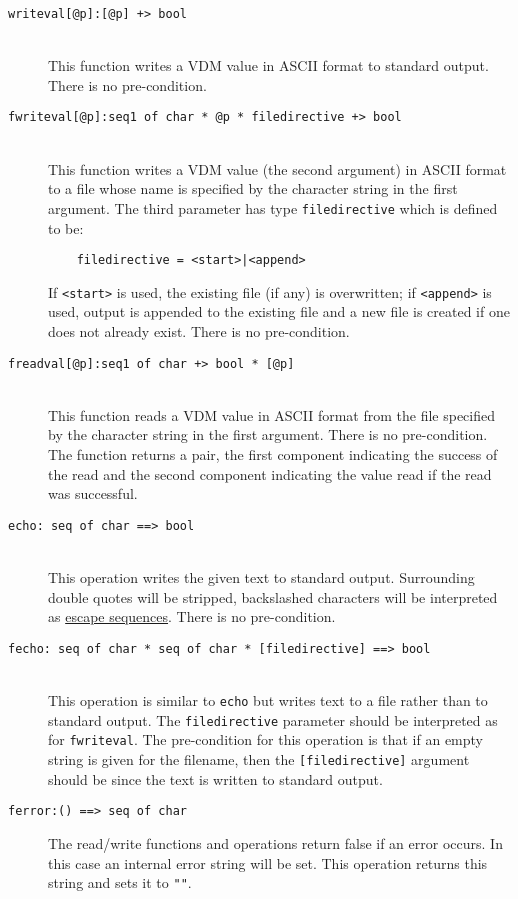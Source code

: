 \documentclass[\pformat,12pt]{article}
\begin{document}
\begin{description}
\item[\texttt{writeval[@p]:[@p] +> bool}] \mbox{}\\
  This function writes a VDM value in ASCII format to standard
  output. There is no pre-condition.
\item[\texttt{fwriteval[@p]:seq1 of char * @p * filedirective +>
    bool}] \mbox{}\\
  This function writes a VDM value (the second argument) in ASCII
  format to a file whose  
  name is specified by the character string in the first argument. The
  third parameter has type \texttt{filedirective} which is defined to be:
  \begin{verbatim}
    filedirective = <start>|<append> 
  \end{verbatim}
  If \texttt{<start>} is used, the existing file (if any) is
  overwritten; if \texttt{<append>} is used, output is appended to the
  existing file and a new file is created if one does not already
  exist. There is no pre-condition.
\item[\texttt{freadval[@p]:seq1 of char +> bool * [@p]}] \mbox{}\\
  This function reads a VDM value in ASCII format from the file
  specified by the character string in the first argument. There is no
  pre-condition. The function returns a pair, the first component
  indicating the success of the read and the second component
  indicating the value read if the read was successful.
\item[\texttt{echo: seq of char ==> bool}] \mbox{}\\
  This operation writes the given text to standard output. Surrounding
  double quotes will be stripped, backslashed characters will be
  interpreted as \hyperlink{rule:escape sequence}{escape sequences}. There is no
  pre-condition. 
\item[\texttt{fecho: seq of char * seq of char * [filedirective] ==> bool}]
  \mbox{}\\
  This operation is similar to \texttt{echo} but writes text to a file
  rather than to standard output. The \texttt{filedirective} parameter
  should be interpreted as for \texttt{fwriteval}. The pre-condition
  for this operation is that if an empty string
  is given for the filename, then the \texttt{[filedirective]}
  argument should be  since the text is written to standard
  output. 
\item[\texttt{ferror:()  ==> seq of char}]
  The read/write functions and operations return false if an error
  occurs. In this case an internal error string will be set. This
  operation returns this string and sets it to \texttt{""}.
\end{description}
\end{document}
